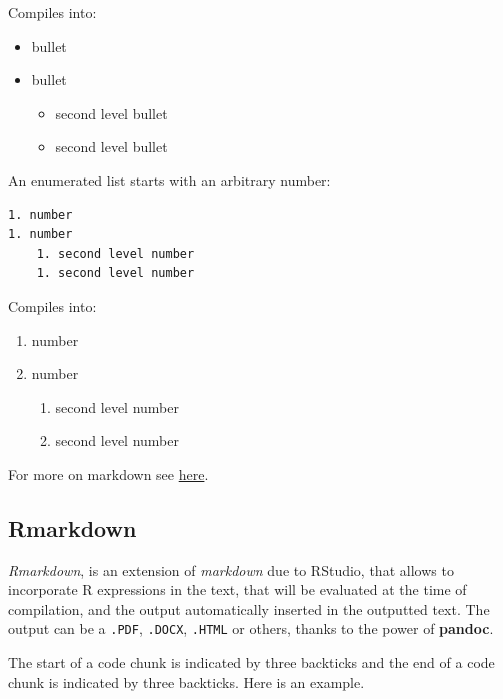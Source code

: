 \documentclass[]{book}
\providecommand{\tightlist}{%
  \setlength{\itemsep}{0pt}\setlength{\parskip}{0pt}}
\theoremstyle{definition}
\theoremstyle{definition}
\theoremstyle{remark}
\begin{document}
Compiles into:

\begin{itemize}
\tightlist
\item
  bullet
\item
  bullet

  \begin{itemize}
  \tightlist
  \item
    second level bullet
  \item
    second level bullet
  \end{itemize}
\end{itemize}

An enumerated list starts with an arbitrary number:

\begin{verbatim}
1. number
1. number
    1. second level number
    1. second level number
\end{verbatim}

Compiles into:

\begin{enumerate}
\def\labelenumi{\arabic{enumi}.}
\tightlist
\item
  number
\item
  number

  \begin{enumerate}
  \def\labelenumii{\arabic{enumii}.}
  \tightlist
  \item
    second level number
  \item
    second level number
  \end{enumerate}
\end{enumerate}

For more on markdown see
\href{https://bookdown.org/yihui/bookdown/markdown-syntax.html}{here}.

\subsection{Rmarkdown}\label{rmarkdown}

\emph{Rmarkdown}, is an extension of \emph{markdown} due to RStudio,
that allows to incorporate R expressions in the text, that will be
evaluated at the time of compilation, and the output automatically
inserted in the outputted text. The output can be a \texttt{.PDF},
\texttt{.DOCX}, \texttt{.HTML} or others, thanks to the power of
\textbf{pandoc}.

The start of a code chunk is indicated by three backticks and the end of
a code chunk is indicated by three backticks. Here is an example.
\end{document}
